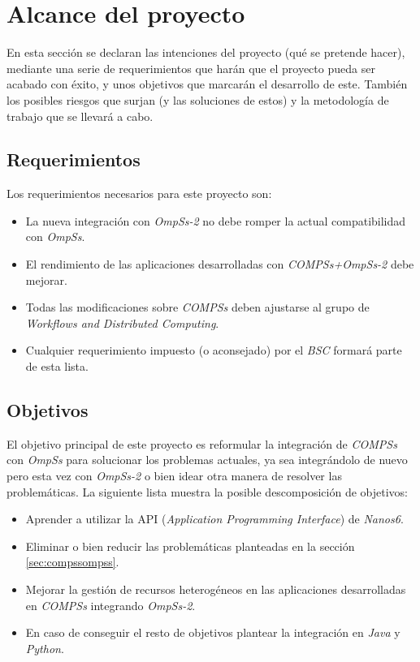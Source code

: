 \section{Alcance del proyecto}

En esta sección se declaran las intenciones del proyecto (qué se pretende hacer), mediante una serie de requerimientos que harán que el proyecto pueda ser acabado con éxito, y unos objetivos que marcarán el desarrollo de este. También los posibles riesgos que surjan (y las soluciones de estos) y la metodología de trabajo que se llevará a cabo.

\subsection{Requerimientos}

 Los requerimientos necesarios para este proyecto son:

\begin{itemize}
 \item La nueva integración con \textit{OmpSs-2} no debe romper la actual compatibilidad con \textit{OmpSs}.
 \item El rendimiento de las aplicaciones desarrolladas con \textit{COMPSs+OmpSs-2} debe mejorar.
 \item Todas las modificaciones sobre \textit{COMPSs} deben ajustarse al grupo de \textit{Workflows and Distributed Computing}.
 \item Cualquier requerimiento impuesto (o aconsejado) por el \textit{BSC} formará parte de esta lista.
  
\end{itemize}

\subsection{Objetivos}

El objetivo principal de este proyecto es reformular la integración de \textit{COMPSs} con \textit{OmpSs} para solucionar los problemas actuales, ya sea integrándolo de nuevo pero esta vez con \textit{OmpSs-2} o bien idear otra manera de resolver las problemáticas. La siguiente lista muestra la posible descomposición de objetivos:

\begin{itemize}
  \item Aprender a utilizar la API (\textit{Application Programming Interface}) de \textit{Nanos6}.
  \item Eliminar o bien reducir las problemáticas planteadas en la sección   \ref{sec:compssompss}.
  \item Mejorar la gestión de recursos heterogéneos en las aplicaciones desarrolladas en \textit{COMPSs} integrando \textit{OmpSs-2}.
  \item En caso de conseguir el resto de objetivos plantear la integración en \textit{Java} y \textit{Python}.
\end{itemize}

